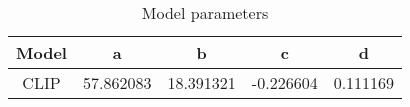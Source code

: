 \begin{table}
\centering
\begin{tabular}{|c||c|c|c|c|}
\hline
\textbf{Model} & \textbf{a} & \textbf{b} & \textbf{c} & \textbf{d} \\
\hline
CLIP & 57.862083 & 18.391321 & -0.226604 & 0.111169 \\
\hline
\end{tabular}
\caption{Model parameters}
\label{tab:coefficients}
\end{table}
